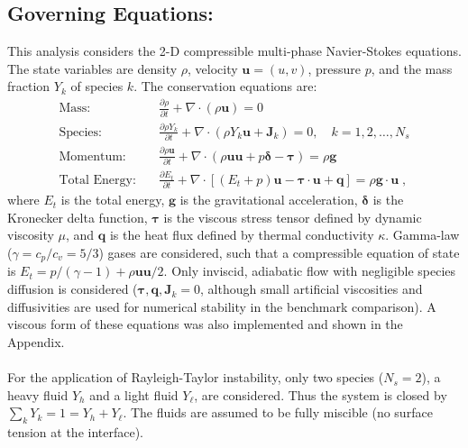 \documentclass{homework}
\begin{document}
\subsection*{Governing Equations: \qquad}
This analysis considers the 2-D compressible multi-phase Navier-Stokes equations. The state variables are density $\rho$, velocity $\mathbf{u} = (u,v)$, pressure $p$, and the mass fraction $Y_k$ of species $k$. The conservation equations are:
\begin{align*}
    \textrm{Mass:} \quad& \frac{\partial \rho}{\partial t} + \nabla \cdot (\rho \mathbf{u}) = 0 \\
    \textrm{Species:} \quad& \frac{\partial \rho Y_k}{\partial t} + \nabla \cdot \left(\rho Y_k \mathbf{u} + \bm{J}_k \right)  = 0, \quad k=1, 2, \ldots, N_s \\
    \textrm{Momentum:} \quad& \frac{\partial \rho \mathbf{u}}{\partial t} + \nabla \cdot \left(\rho \mathbf{uu} + p \bm{\delta} - \bm{\tau}\right) = \rho \mathbf{g} \\
    \textrm{Total Energy:} \quad& \frac{\partial E_t}{\partial t} + \nabla \cdot \left[\left(E_t + p \right) \mathbf{u} - \bm{\tau} \cdot \mathbf{u} + \bm{q} \right] = \rho \mathbf{g} \cdot \mathbf{u} \; ,
\end{align*}
where $E_t$ is the total energy, $\mathbf{g}$ is the gravitational acceleration, $\bm{\delta}$ is the Kronecker delta function, $\bm{\tau}$ is the viscous stress tensor defined by dynamic viscosity $\mu$, and $\mathbf{q}$ is the heat flux defined by thermal conductivity $\kappa$. Gamma-law ($\gamma = c_p / c_v = 5/3$) gases are considered, such that a compressible equation of state is $E_t = p /(\gamma - 1) + \rho \mathbf{u} \mathbf{u} / 2 $. Only inviscid, adiabatic flow with negligible species diffusion is considered ($\bm{\tau},\bm{q},\bm{J}_k = 0$, although small artificial viscosities and diffusivities are used for numerical stability in the benchmark comparison). A viscous form of these equations was also implemented and shown in the Appendix.
\\ \\
For the application of Rayleigh-Taylor instability, only two species ($N_s=2$), a heavy fluid $Y_h$ and a light fluid $Y_\ell$, are considered. Thus the system is closed by $\sum_k Y_k = 1 = Y_h + Y_\ell$. The fluids are assumed to be fully miscible (no surface tension at the interface).
\end{document}
